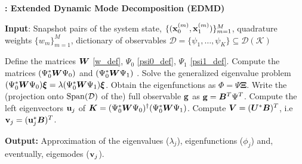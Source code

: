 \begin{algorithm}
\caption{\textbf{: Extended Dynamic Mode Decomposition (EDMD)}}
\label{alg_edmd}
\textbf{Input}: Snapshot pairs of the system state, $\{(\vb{x}_0^{(m)}, \vb{x}_1^{(m)})\}_{m = 1}^M$, quadrature weights $\{w_m\}_{m = 1}^M$, dictionary of observables $\mathcal{D} = \{\psi_1, \dots, \psi_K\} \subseteq \mathcal{D}(\mathcal{K})$
\begin{algorithmic}[1]
\State Define the matrices $\vb*{W}$ \eqref{w_def}, $\Psi_0$ \eqref{psi0_def}, $\Psi_1$ \eqref{psi1_def}. 
\State Compute the matrices $(\Psi_0^*\vb*{W}\Psi_0)$ and $(\Psi_0^*\vb*{W}\Psi_1)$ .
\State Solve the generalized eigenvalue problem $(\Psi_0^*\vb*{W}\Psi_0)\bm{\xi} = \lambda(\Psi_0^*\vb*{W}\Psi_1)\bm{\xi}$.
\State Obtain the eigenfunctions as $\Phi = \Psi\bm{\Xi}$.
    \State Write the (projection onto $\mathrm{Span}(\mathcal{D})$ of the) full observable $\vb{g}$ as $\vb{g} = \vb*{B}^T\Psi^T$.
    \State Compute the left eigenvectors $\vb{u}_j$ of $\vb*{K} = (\Psi_0^*\vb*{W}\Psi_0)^{\dagger}(\Psi_0^*\vb*{W}\Psi_1)$.
    \State Compute $\vb*{V} = (\vb*{U}^*\vb*{B})^T$, i.e $\vb{v}_j = (\vb{u}_j^*\vb*{B})^T$.
\EndIf
\end{algorithmic}
\textbf{Output:} Approximation of the eigenvalues ($\lambda_j$), eigenfunctions ($\phi_j$) and, eventually, eigemodes ($\vb{v}_j$).
\end{algorithm}


